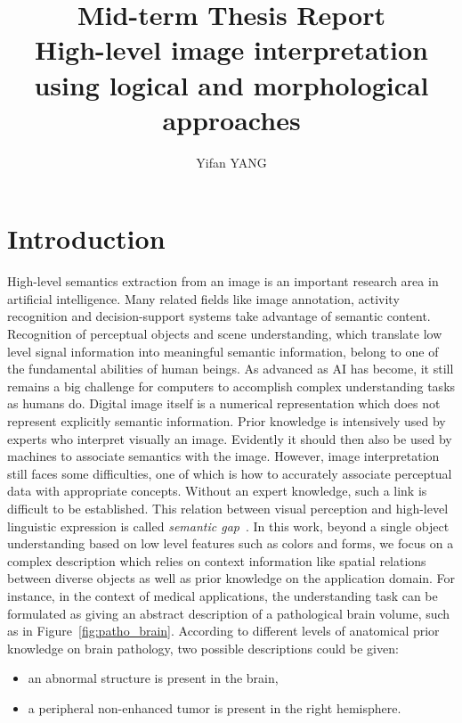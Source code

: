 \documentclass{article}
\title{Mid-term Thesis Report\\High-level image interpretation using logical and morphological approaches}
\author{Yifan YANG}
\begin{document}
\maketitle
\section{Introduction}
 High-level semantics extraction from an image is an important research area  in artificial intelligence.
 Many related fields like image annotation, activity recognition and  decision-support systems take advantage of semantic content.
 Recognition of perceptual objects and scene understanding, which translate low level signal information into meaningful semantic information, belong to one of the fundamental abilities of human beings.
 As advanced as AI has become, it still remains a big challenge for computers to accomplish complex understanding tasks as humans do.
 Digital image itself is a numerical representation which does not represent explicitly semantic information. 
 Prior knowledge is intensively used by experts who interpret visually an image. Evidently it should then also be used by machines to associate semantics with the image.  
However, image interpretation still faces some difficulties, one of which is how to accurately associate perceptual data with appropriate concepts. Without an expert knowledge,
such a link is difficult to be established. This relation between visual perception and high-level linguistic expression is called \textit{semantic gap}~\cite{hudelot2008spatial}.
 In this work, beyond a single object understanding based on low level features such as colors and forms, we focus on a complex description which relies on context information like spatial relations
 between diverse objects as well as prior knowledge on the application domain. 
 For instance, in the context of medical applications, the understanding task can be formulated as giving an abstract description of a pathological brain volume, such as in Figure~\ref{fig:patho_brain}. 
  According to different levels of anatomical prior knowledge on brain pathology, two possible descriptions could be given:
 \begin{itemize}
  \item an abnormal structure is present in the brain,
  \item a peripheral non-enhanced tumor is present in the right hemisphere.
 \end{itemize}
\end{document}
